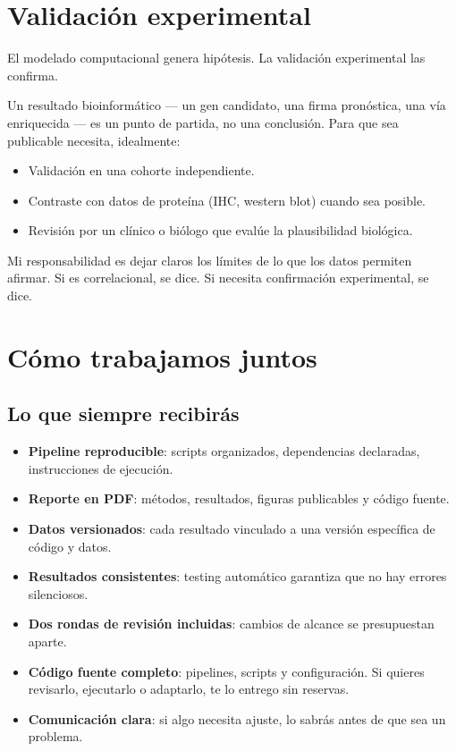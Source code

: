 \documentclass[11pt]{article}
\begin{document}
\section*{Validación experimental}

El modelado computacional genera hipótesis. La validación experimental las confirma.

Un resultado bioinformático --- un gen candidato, una firma pronóstica, una vía enriquecida --- es un punto de partida, no una conclusión. Para que sea publicable necesita, idealmente:
\begin{itemize}[label=\textendash]
  \item Validación en una cohorte independiente.
  \item Contraste con datos de proteína (IHC, western blot) cuando sea posible.
  \item Revisión por un clínico o biólogo que evalúe la plausibilidad biológica.
\end{itemize}

Mi responsabilidad es dejar claros los límites de lo que los datos permiten afirmar. Si es correlacional, se dice. Si necesita confirmación experimental, se dice.

\section*{Cómo trabajamos juntos}

\subsection*{Lo que siempre recibirás}

\begin{sloppypar}
\begin{itemize}[label=\textendash]
  \item \textbf{Pipeline reproducible}: scripts organizados, dependencias declaradas, instrucciones de ejecución.
  \item \textbf{Reporte en PDF}: métodos, resultados, figuras publicables y código fuente.
  \item \textbf{Datos versionados}: cada resultado vinculado a una versión específica de código y datos.
  \item \textbf{Resultados consistentes}: testing automático garantiza que no hay errores silenciosos.
  \item \textbf{Dos rondas de revisión incluidas}: cambios de alcance se presupuestan aparte.
  \item \textbf{Código fuente completo}: pipelines, scripts y configu\-ración. Si quieres revisarlo, ejecutarlo o adaptarlo, te lo entrego sin reservas.
  \item \textbf{Comunicación clara}: si algo necesita ajuste, lo sabrás antes de que sea un problema.
\end{itemize}
\end{sloppypar}
\end{document}
